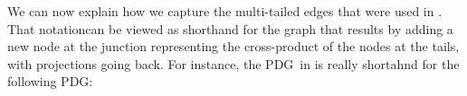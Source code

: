 \documentclass{article}
\newcommand{\MN}{PDG}
\numberwithin{equation}{section}
\begin{document}
\begin{notfocus}



	We can now explain how we capture the multi-tailed edges that were used in 
	.
%
That notationcan be viewed as shorthand for the graph that results by
        adding a new
node at the junction representing the cross-product of the 
nodes at the tails, with projections going back.  For
instance,  the \MN\ in 
is really shortahnd for the following PDG:
	\begin{center}
\end{center}
\end{notfocus}
\end{document}
